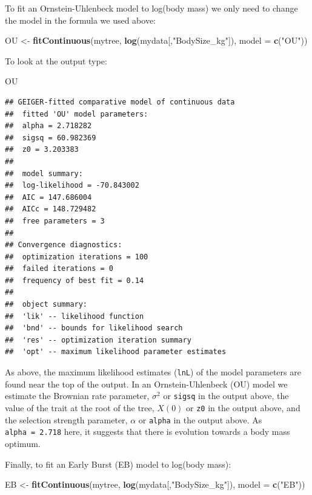 \documentclass[]{book}
\newenvironment{Shaded}{\begin{snugshade}}{\end{snugshade}}
\newcommand{\KeywordTok}[1]{\textcolor[rgb]{0.13,0.29,0.53}{\textbf{{#1}}}}
\newcommand{\DataTypeTok}[1]{\textcolor[rgb]{0.13,0.29,0.53}{{#1}}}
\newcommand{\StringTok}[1]{\textcolor[rgb]{0.31,0.60,0.02}{{#1}}}
\newcommand{\NormalTok}[1]{{#1}}
\begin{document}
To fit an Ornstein-Uhlenbeck model to log(body mass) we only need to
change the model in the formula we used above:

\begin{Shaded}
\begin{Highlighting}[]
\NormalTok{OU <-}\StringTok{ }\KeywordTok{fitContinuous}\NormalTok{(mytree, }\KeywordTok{log}\NormalTok{(mydata[,}\StringTok{"BodySize_kg"}\NormalTok{]), }\DataTypeTok{model =} \KeywordTok{c}\NormalTok{(}\StringTok{"OU"}\NormalTok{))}
\end{Highlighting}
\end{Shaded}

To look at the output type:

\begin{Shaded}
\begin{Highlighting}[]
\NormalTok{OU}
\end{Highlighting}
\end{Shaded}

\begin{verbatim}
## GEIGER-fitted comparative model of continuous data
##  fitted 'OU' model parameters:
##  alpha = 2.718282
##  sigsq = 60.982369
##  z0 = 3.203383
## 
##  model summary:
##  log-likelihood = -70.843002
##  AIC = 147.686004
##  AICc = 148.729482
##  free parameters = 3
## 
## Convergence diagnostics:
##  optimization iterations = 100
##  failed iterations = 0
##  frequency of best fit = 0.14
## 
##  object summary:
##  'lik' -- likelihood function
##  'bnd' -- bounds for likelihood search
##  'res' -- optimization iteration summary
##  'opt' -- maximum likelihood parameter estimates
\end{verbatim}

As above, the maximum likelihood estimates (\texttt{lnL}) of the model
parameters are found near the top of the output. In an
Ornstein-Uhlenbeck (OU) model we estimate the Brownian rate parameter,
\(\sigma^2\) or \texttt{sigsq} in the output above, the value of the
trait at the root of the tree, \(X(0)\) or \texttt{z0} in the output
above, and the selection strength parameter, \(\alpha\) or
\texttt{alpha} in the output above. As \texttt{alpha\ =\ 2.718} here, it
suggests that there is evolution towards a body mass optimum.

Finally, to fit an Early Burst (EB) model to log(body mass):

\begin{Shaded}
\begin{Highlighting}[]
\NormalTok{EB <-}\StringTok{ }\KeywordTok{fitContinuous}\NormalTok{(mytree, }\KeywordTok{log}\NormalTok{(mydata[,}\StringTok{"BodySize_kg"}\NormalTok{]), }\DataTypeTok{model =} \KeywordTok{c}\NormalTok{(}\StringTok{"EB"}\NormalTok{))}
\end{Highlighting}
\end{Shaded}
\end{document}
